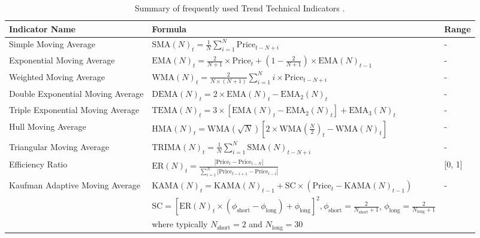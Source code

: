\begin{table}[htb!]
\centering
\footnotesize
\caption{Summary of frequently used Trend Technical Indicators \cite{jansen_machine_2020}.}
\label{Tables:TrendIndicators}
\begin{tabularx}{\textwidth}{@{}lXl@{}}
\toprule
\textbf{Indicator Name} & \textbf{Formula} & \textbf{Range} \\
\midrule
Simple Moving Average & $\text{SMA}(N)_t = \frac{1}{N} \sum_{i=1}^{N} \text{Price}_{t-N+i}$ & - \\
\addlinespace
Exponential Moving Average & $\text{EMA}(N)_t = \frac{2}{N+1} \times \text{Price}_t + (1 - \frac{2}{N+1}) \times \text{EMA}(N)_{t-1}$ & - \\
\addlinespace
Weighted Moving Average & $\text{WMA}(N)_t = \frac{2}{N \times (N + 1)} \sum_{i=1}^{N} i \times \text{Price}_{t-N+i}$ & - \\
\addlinespace
Double Exponential Moving Average & $\text{DEMA}(N)_t = 2 \times \text{EMA}(N)_t - \text{EMA}_2(N)_t$ & - \\
\addlinespace
Triple Exponential Moving Average & $\text{TEMA}(N)_t = 3 \times [\text{EMA}(N)_t - \text{EMA}_2(N)_t] + \text{EMA}_3(N)_t$ & - \\
\addlinespace
Hull Moving Average & $\text{HMA}(N)_t = \text{WMA}\left(\sqrt{N}\right)\left[2 \times \text{WMA}\left(\frac{N}{2}\right)_t - \text{WMA}(N)_t\right]$ & - \\
\addlinespace
Triangular Moving Average & $\text{TRIMA}(N)_t = \frac{1}{N} \sum_{i=1}^{N} \text{SMA}(N)_{t-N+i}$ & - \\
\addlinespace
Efficiency Ratio & $\text{ER}(N)_t = \frac{| \text{Price}_t - \text{Price}_{t-N} |}{\sum_{i=1}^{N} | \text{Price}_{t-i+1} - \text{Price}_{t-i} |}$ & [0, 1] \\
\addlinespace
Kaufman Adaptive Moving Average & $\text{KAMA}(N)_t = \text{KAMA}(N)_{t-1} + \text{SC} \times (\text{Price}_t - \text{KAMA}(N)_{t-1})$ & - \\
\addlinespace
& $\text{SC} = [ \text{ER}(N)_t \times (\phi_{\text{short}} - \phi_{\text{long}}) + \phi_{\text{long}} ]^2, \phi_{\text{short}} = \frac{2}{N_{\text{short}} + 1}$, $\phi_{\text{long}} = \frac{2}{N_{\text{long}} + 1}$ & \\
\addlinespace
& where typically $N_{\text{short}} = 2$ and $N_{\text{long}} = 30$ & \\
\bottomrule
\end{tabularx}
\end{table}